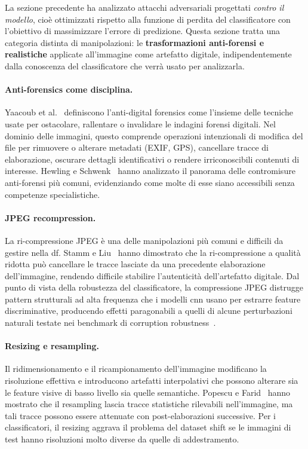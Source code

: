 La sezione precedente ha analizzato attacchi adversariali progettati \textit{contro il modello}, cioè ottimizzati rispetto alla funzione di perdita del classificatore con l'obiettivo di massimizzare l'errore di predizione. Questa sezione tratta una categoria distinta di manipolazioni: le \textbf{trasformazioni anti-forensi e realistiche} applicate all'immagine come artefatto digitale, indipendentemente dalla conoscenza del classificatore che verrà usato per analizzarla.

\paragraph{Anti-forensics come disciplina.}
Yaacoub et al.~\cite{yaacoub2021digital} definiscono l'anti-digital forensics come l'insieme delle tecniche usate per ostacolare, rallentare o invalidare le indagini forensi digitali. Nel dominio delle immagini, questo comprende operazioni intenzionali di modifica del file per rimuovere o alterare metadati (EXIF, GPS), cancellare tracce di elaborazione, oscurare dettagli identificativi o rendere irriconoscibili contenuti di interesse. Hewling e Schwenk~\cite{hewling2018anti} hanno analizzato il panorama delle contromisure anti-forensi più comuni, evidenziando come molte di esse siano accessibili senza competenze specialistiche.

\paragraph{JPEG recompression.}
La ri-compressione JPEG è una delle manipolazioni più comuni e difficili da gestire nella \gls{df}. Stamm e Liu~\cite{stamm2010anti} hanno dimostrato che la ri-compressione a qualità ridotta può cancellare le tracce lasciate da una precedente elaborazione dell'immagine, rendendo difficile stabilire l'autenticità dell'artefatto digitale. Dal punto di vista della robustezza del classificatore, la compressione JPEG distrugge pattern strutturali ad alta frequenza che i modelli \gls{cnn} usano per estrarre feature discriminative, producendo effetti paragonabili a quelli di alcune perturbazioni naturali testate nei benchmark di corruption robustness~\cite{hendrycks2019benchmarking}.

\paragraph{Resizing e resampling.}
Il ridimensionamento e il ricampionamento dell'immagine modificano la risoluzione effettiva e introducono artefatti interpolativi che possono alterare sia le feature visive di basso livello sia quelle semantiche. Popescu e Farid~\cite{popescu2005exposing} hanno mostrato che il resampling lascia tracce statistiche rilevabili nell'immagine, ma tali tracce possono essere attenuate con post-elaborazioni successive. Per i classificatori, il resizing aggrava il problema del dataset shift se le immagini di test hanno risoluzioni molto diverse da quelle di addestramento.

